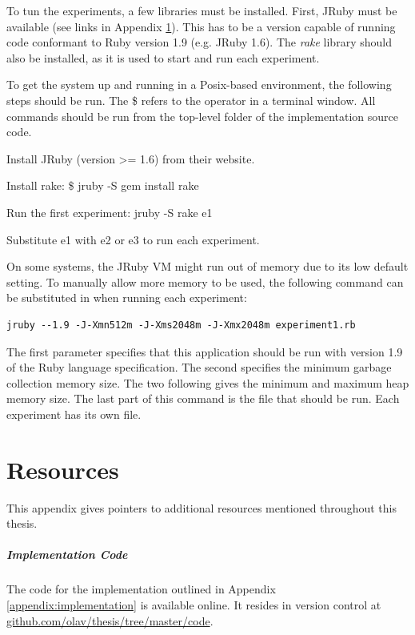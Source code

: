 To tun the experiments, a few libraries must be installed. 
First, JRuby must be available (see links in Appendix \ref{appendix:resources}).
This has to be a version capable of running code conformant to Ruby version 1.9 (e.g. JRuby 1.6).
The \emph{rake} library should also be installed, as it is used to start and run each experiment.

To get the system up and running in a Posix-based environment, 
the following steps should be run.
The \textsf{\$} refers to the operator in a terminal window.
All commands should be run from the top-level folder of the implementation source code.

\begin{enumerate*}
  \item Install JRuby (version >= 1.6) from their website.
  \item Install rake: \textsf{\$ jruby -S gem install rake}
  \item Run the first experiment: \textsf{jruby -S rake e1}
  \item Substitute \textsf{e1} with \textsf{e2} or \textsf{e3} to run each experiment.
\end{enumerate*}

On some systems, the JRuby VM might run out of memory due to its low default setting.
To manually allow more memory to be used, the following command
can be substituted in when running each experiment:

{
\footnotesize
\begin{verbatim}
jruby --1.9 -J-Xmn512m -J-Xms2048m -J-Xmx2048m experiment1.rb
\end{verbatim}
}

The first parameter specifies that this application should be run with version 1.9 of the Ruby language specification.
The second specifies the minimum garbage collection memory size.
The two following gives the minimum and maximum heap memory size.
The last part of this command is the file that should be run.
Each experiment has its own file.


\chapter{Resources}
\label{appendix:resources}

This appendix gives pointers to additional resources mentioned throughout this thesis.

\paragraph{Implementation Code}
The code for the implementation outlined in Appendix \ref{appendix:implementation} is available online.
It resides in version control at 
\url{github.com/olav/thesis/tree/master/code}.

